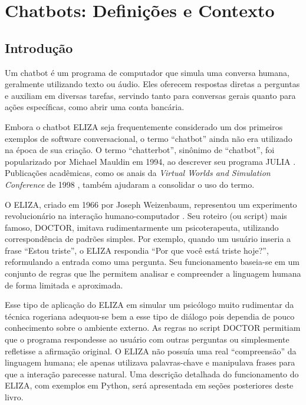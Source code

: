 \documentclass[14pt,a4paper,oneside]{book}
\begin{document}
\newpage

\tableofcontents
\newpage


\chapter{Chatbots: Definições e Contexto}

\section{Introdução}

Um chatbot é um programa de computador que simula uma conversa humana, geralmente utilizando texto ou áudio. Eles oferecem respostas diretas a perguntas e auxiliam em diversas tarefas, servindo tanto para conversas gerais quanto para ações específicas, como abrir uma conta bancária.

Embora o chatbot ELIZA \cite{Weizenbaum1996} seja frequentemente considerado um dos primeiros exemplos de software conversacional, o termo ``chatbot'' ainda não era utilizado na época de sua criação. 
O termo ``chatterbot'', sinônimo de ``chatbot'', foi popularizado por Michael Mauldin em 1994, ao descrever seu programa JULIA \cite{Mauldin1994}. 
Publicações acadêmicas, como os anais da \textit{Virtual Worlds and Simulation Conference} de 1998 \cite{Jacobstein1998}, também ajudaram a consolidar o uso do termo.

O ELIZA, criado em 1966 por Joseph Weizenbaum,  representou um experimento revolucionário na interação humano-computador \cite{Weizenbaum1996}. Seu roteiro (ou script)  mais famoso, DOCTOR, imitava rudimentarmente um psicoterapeuta, utilizando correspondência de padrões simples. Por exemplo, quando um usuário inseria a frase “Estou triste”, o ELIZA respondia “Por que você está triste hoje?”, reformulando a entrada como uma pergunta. 
Seu funcionamento baseia-se em um conjunto de regras que lhe permitem analisar e compreender a linguagem humana de forma limitada e aproximada. 

Esse tipo de aplicação do ELIZA em simular um psicólogo muito rudimentar da técnica rogeriana adequou-se bem a esse tipo de diálogo pois dependia de pouco conhecimento sobre o ambiente externo. As regras no script DOCTOR permitiam que o programa respondesse ao usuário com outras perguntas ou simplesmente refletisse a afirmação original. 
O ELIZA não possuía uma real ``compreensão'' da linguagem humana; ele apenas utilizava palavras-chave e manipulava frases para que a interação parecesse natural. Uma descrição detalhada do funcionamento do ELIZA, com exemplos em Python, será apresentada em seções posteriores deste livro.
\end{document}
